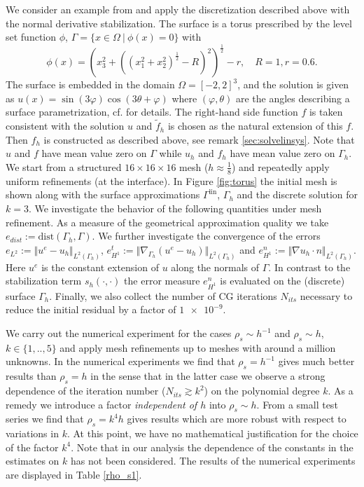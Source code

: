 \documentclass[final]{siamltex}
\begin{document}
We consider an example from \cite{grande2014highordersjna} and apply the discretization described above with the normal derivative stabilization. The surface is a torus prescribed by the level set function $\phi$, $\Gamma = \{x \in \Omega~|~\phi(x) = 0\}$ with
\[
 \phi(x) = \left(x_3^2 + \left( \left(x_1^2+x_2^2\right)^\frac12 - R \right)^2\right)^\frac12 - r, \quad R=1, r=0.6.
\]
The surface is embedded in the domain $\Omega=[-2,2]^3$, and the solution is given as $u(x) = \sin(3 \varphi) \cos(3 \theta + \varphi)$ where $(\varphi,\theta)$ are the angles describing a surface parametrization, cf. \cite{grande2014highordersjna} for details. 
The right-hand side function $f$ is taken consistent with the solution $u$ and $\tilde{f}_h$ is chosen as the natural extension of this $f$. Then $f_h$ is constructed as described above, see remark \ref{sec:solvelinsys}.
Note that $u$ and $f$ have mean value zero on $\Gamma$ while $u_h$ and $f_h$ have mean value zero on $\Gamma_h$.
We start from a structured $16 \times 16 \times 16$ mesh ($h \approx \frac18$) and repeatedly apply uniform refinements (at the interface). 
In Figure \ref{fig:torus} the initial mesh is shown along with the surface approximations ${\Gamma^{\text{lin}}}$, $\Gamma_h$ and the discrete solution for $k=3$.
We investigate the behavior of the following quantities under mesh refinement. As a measure of the geometrical approximation quality we take $e_{dist} := \mathrm{dist}(\Gamma_h,\Gamma)$.
We further investigate the convergence of the errors 
$e_{L^2} := \Vert u^e - u_h \Vert_{L^2(\Gamma_h)}$, 
$e_{H^1}^t := \Vert \nabla_{\Gamma_h} (u^e - u_h) \Vert_{L^2(\Gamma_h)}$ and 
$e_{H^1}^n := \Vert \nabla u_h \cdot n \Vert_{L^2(\Gamma_h)}$. 
Here $u^e$ is the constant extension of $u$ along the normals of $\Gamma$.
In contrast to the stabilization term $s_h(\cdot,\cdot)$ 
the error measure $e_{H^1}^n$ is evaluated on the (discrete) surface $\Gamma_h$.
Finally, we also collect the number of CG iterations $N_{its}$ necessary to reduce the initial residual by a factor of $\num{1e-9}$.

We carry out the numerical experiment for the cases $\rho_s \sim h^{-1}$ and $\rho_s \sim h$, $k \in \{1,..,5\}$ and apply mesh refinements up to meshes with around a million unknowns.
In the numerical experiments we find that $\rho_s = h^{-1}$ gives much better results than $\rho_s = h$ in the sense that in the latter case we observe a strong dependence of the iteration number ($N_{its} \gtrsim k^2$) on the polynomial degree $k$. As a remedy we introduce a factor \emph{independent of $h$} into $\rho_s\sim h$. From a small test series we find that $\rho_s =   k^4 h$ gives results which are more robust with respect to variations in $k$.
At this point, we have no mathematical justification for the choice of the factor $k^4$. Note  that in our analysis  the dependence of the constants in the estimates on $k$  has not been considered. The results of the numerical experiments are displayed in Table \ref{rho_s1}.
\end{document}
